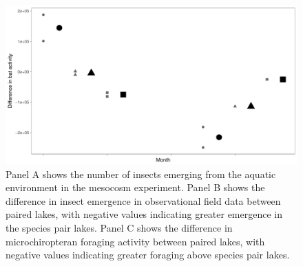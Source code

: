 \documentclass[11pt]{article}
\begin{document}
\begin{figure}[ht]
\includegraphics[scale = 0.4]{Field_Bat_170403.pdf}
\caption{Panel A shows the number of insects emerging from the aquatic environment in the mesocosm experiment.  Panel B shows the difference in insect emergence in observational field data between paired lakes, with negative values indicating greater emergence in the species pair lakes.  Panel C shows the difference in microchiropteran foraging activity between paired lakes, with negative values indicating greater foraging above species pair lakes.}
\label{Fig:AnotherFigure}
\end{figure}





\end{document}
